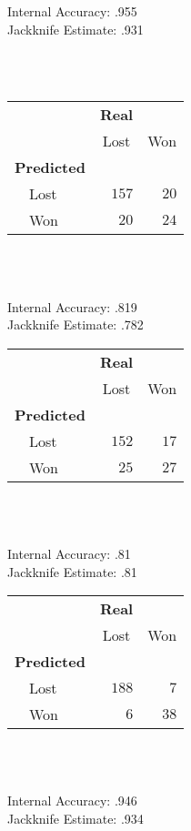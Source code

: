 \documentclass[jou,apacite]{apa6}
\begin{document}
\begin{table*}
{\begin{minipage}{.33\textwidth}
\begin{tablenotes}
\item Internal Accuracy: .955 \\
Jackknife Estimate: .931
\end{tablenotes}
\end{minipage}
\\ \\
\begin{minipage}{.33\textwidth}
\caption*{Lead Actress}
\begin{tabular}{lrr}
\hline\hline
\multicolumn{1}{l}{}&\multicolumn{1}{c}{\bfseries{Real}}&\multicolumn{1}{c}{}\tabularnewline
&\multicolumn{1}{c}{\scriptsize Lost}&\multicolumn{1}{c}{\scriptsize Won}\tabularnewline
\hline
{\bfseries Predicted}&&\tabularnewline
~~Lost&$157$&$20$\tabularnewline
~~Won&$ 20$&$24$\tabularnewline
\hline
\end{tabular} \\ \\
\begin{tablenotes}
\item Internal Accuracy: .819 \\
 Jackknife Estimate: .782
\end{tablenotes}
\end{minipage}
\begin{minipage}{.33\textwidth}
\caption*{Supporting Actress}
\begin{tabular}{lrr}
\hline\hline
\multicolumn{1}{l}{}&\multicolumn{1}{c}{\textbf{Real}}&\multicolumn{1}{c}{}\tabularnewline
&\multicolumn{1}{c}{{Lost}}&\multicolumn{1}{c}{{Won}}\tabularnewline
\hline
{\bfseries Predicted}&&\tabularnewline
~~Lost&$152$&$17$\tabularnewline
~~Won&$ 25$&$27$\tabularnewline
\hline
\end{tabular} \\ \\
\begin{tablenotes}
\item Internal Accuracy: .81 \\
Jackknife Estimate: .81
\end{tablenotes}
\end{minipage}
\begin{minipage}{.33\textwidth}
\caption*{Picture}
\begin{tabular}{lrr}
\hline\hline
\multicolumn{1}{l}{}&\multicolumn{1}{c}{\textbf{Real}}&\multicolumn{1}{c}{}\tabularnewline
&\multicolumn{1}{c}{{Lost}}&\multicolumn{1}{c}{{Won}}\tabularnewline
\hline
{\bfseries Predicted}&&\tabularnewline
~~Lost&$188$&$7$\tabularnewline
~~Won&$ 6$&$38$\tabularnewline
\hline
\end{tabular} \\ \\
\begin{tablenotes}
\item Internal Accuracy: .946 \\
Jackknife Estimate: .934
\end{tablenotes}
\end{minipage}
}
\end{table*}
\end{document}
